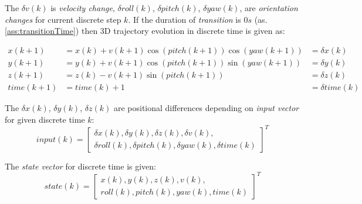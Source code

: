 \noindent The $\delta v(k)$ is \emph{velocity change}, $\delta roll(k)$, $\delta pitch(k)$, $\delta yaw(k)$, are \emph{orientation changes} for current discrete step $k$. If the duration of \emph{transition} is $0 s$ (as. \ref{ass:transitionTime}) then 3D trajectory evolution in discrete time is given as: 

\begin{equation}\label{eq:applyMovement2}
    \begin{aligned}
        x(k+1)&= x(k) + v(k+1) \cos(pitch(k+1)) \cos(yaw(k+1)) & = \delta x(k)\\
        y(k+1)&= y(k) + v(k+1) \cos(pitch(k+1)) \sin(yaw(k+1)) & = \delta y(k)\\
        z(k+1)&= z(k) - v(k+1) \sin(pitch(k+1))                & = \delta z(k)\\
        time(k+1)& = time(k)+1                                & = \delta time(k)
    \end{aligned}    
\end{equation}

\noindent The $\delta x(k)$, $\delta y(k)$, $\delta z(k)$ are positional differences depending on \emph{input vector} for given discrete time $k$:
\begin{equation}\label{eq:ourImput}
    input(k) = \left[
                    \begin{gathered}
                    \delta x(k), \delta y(k), \delta z(k), \delta v (k),\\
                    \delta roll (k), \delta pitch(k), \delta yaw(k),\delta time (k)
                    \end{gathered} 
                \right]^T
\end{equation}

\noindent The \emph{state vector} for discrete time is given:
\begin{equation}\label{eq:ourState}
    state(k) = \left[
                    \begin{gathered}
                     x(k),  y(k),  z(k),  v (k),\\
                     roll (k),  pitch(k),  yaw(k), time (k)
                    \end{gathered} 
                \right]^T
\end{equation}

